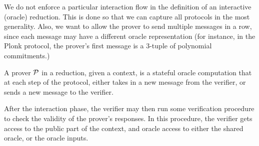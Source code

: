 
\begin{remark}
    We do not enforce a particular interaction flow in the definition of an interactive (oracle) reduction. This is done so that we can capture all protocols in the most generality. Also, we want to allow the prover to send multiple messages in a row, since each message may have a different oracle representation (for instance, in the Plonk protocol, the prover's first message is a 3-tuple of polynomial commitments.)
\end{remark}

\begin{definition}
    \label{def:prover}
    A prover $\mathcal{P}$ in a reduction, given a context, is a stateful oracle computation
    that at each step of the protocol, either takes in a new message from the verifier, or sends a
    new message to the verifier.
\end{definition}

\begin{definition}
    \label{def:oracle_prover}
\end{definition}


After the interaction phase, the verifier may then run some verification procedure to check the
validity of the prover's responses. In this procedure, the verifier gets access to the public part
of the context, and oracle access to either the shared oracle, or the oracle inputs.

